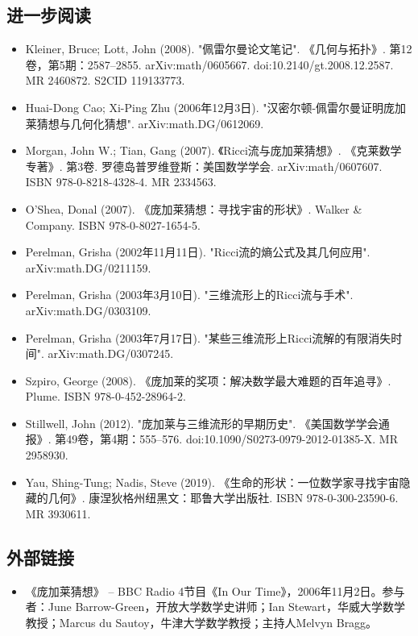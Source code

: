 \subsection{进一步阅读}  
\begin{itemize}
\item Kleiner, Bruce; Lott, John (2008). "佩雷尔曼论文笔记". 《几何与拓扑》. 第12卷，第5期：2587–2855. arXiv:math/0605667. doi:10.2140/gt.2008.12.2587. MR 2460872. S2CID 119133773.  
\item Huai-Dong Cao; Xi-Ping Zhu (2006年12月3日). "汉密尔顿-佩雷尔曼证明庞加莱猜想与几何化猜想". arXiv:math.DG/0612069.  
\item Morgan, John W.; Tian, Gang (2007). 《Ricci流与庞加莱猜想》. 《克莱数学专著》. 第3卷. 罗德岛普罗维登斯：美国数学学会. arXiv:math/0607607. ISBN 978-0-8218-4328-4. MR 2334563.  
\item O'Shea, Donal (2007). 《庞加莱猜想：寻找宇宙的形状》. Walker & Company. ISBN 978-0-8027-1654-5.  
\item Perelman, Grisha (2002年11月11日). "Ricci流的熵公式及其几何应用". arXiv:math.DG/0211159.  
\item Perelman, Grisha (2003年3月10日). "三维流形上的Ricci流与手术". arXiv:math.DG/0303109.  
\item Perelman, Grisha (2003年7月17日). "某些三维流形上Ricci流解的有限消失时间". arXiv:math.DG/0307245.  
\item Szpiro, George (2008). 《庞加莱的奖项：解决数学最大难题的百年追寻》. Plume. ISBN 978-0-452-28964-2.  
\item Stillwell, John (2012). "庞加莱与三维流形的早期历史". 《美国数学学会通报》. 第49卷，第4期：555–576. doi:10.1090/S0273-0979-2012-01385-X. MR 2958930.  
\item Yau, Shing-Tung; Nadis, Steve (2019). 《生命的形状：一位数学家寻找宇宙隐藏的几何》. 康涅狄格州纽黑文：耶鲁大学出版社. ISBN 978-0-300-23590-6. MR 3930611.
\end{itemize}
\subsection{外部链接}
\begin{itemize}
\item 《庞加莱猜想》 – BBC Radio 4节目《In Our Time》，2006年11月2日。参与者：June Barrow-Green，开放大学数学史讲师；Ian Stewart，华威大学数学教授；Marcus du Sautoy，牛津大学数学教授；主持人Melvyn Bragg。
\end{itemize}